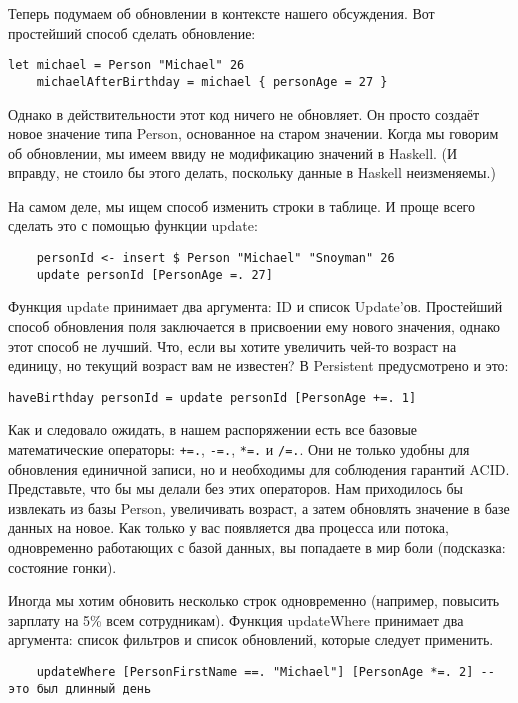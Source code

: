 Теперь подумаем об обновлении в контексте нашего обсуждения. Вот простейший способ сделать обновление:

\begin{lstlisting}
let michael = Person "Michael" 26
    michaelAfterBirthday = michael { personAge = 27 }
\end{lstlisting}

Однако в действительности этот код ничего не обновляет. Он просто создаёт новое значение типа Person, основанное на старом значении. Когда мы говорим об обновлении, мы имеем ввиду не модификацию значений в Haskell. (И вправду, не стоило бы этого делать, поскольку данные в Haskell неизменяемы.)

На самом деле, мы ищем способ изменить строки в таблице. И проще всего сделать это с помощью функции update:

\begin{lstlisting}
    personId <- insert $ Person "Michael" "Snoyman" 26
    update personId [PersonAge =. 27]
\end{lstlisting}

Функция update принимает два аргумента: ID и список Update'ов. Простейший способ обновления поля заключается в присвоении ему нового значения, однако этот способ не лучший. Что, если вы хотите увеличить чей-то возраст на единицу, но текущий возраст вам не известен? В Persistent предусмотрено и это:

\begin{lstlisting}
haveBirthday personId = update personId [PersonAge +=. 1]
\end{lstlisting}

Как и следовало ожидать, в нашем распоряжении есть все базовые математические операторы: \lstinline'+=.', \lstinline'-=.', \lstinline'*=.' и \lstinline'/=.'. Они не только удобны для обновления единичной записи, но и необходимы для соблюдения гарантий ACID. Представьте, что бы мы делали без этих операторов. Нам приходилось бы извлекать из базы Person, увеличивать возраст, а затем обновлять значение в базе данных на новое. Как только у вас появляется два процесса или потока, одновременно работающих с базой данных, вы попадаете в мир боли (подсказка: состояние гонки).

Иногда мы хотим обновить несколько строк одновременно (например, повысить зарплату на 5\% всем сотрудникам). Функция updateWhere принимает два аргумента: список фильтров и список обновлений, которые следует применить.

\begin{lstlisting}
    updateWhere [PersonFirstName ==. "Michael"] [PersonAge *=. 2] -- это был длинный день
\end{lstlisting}

